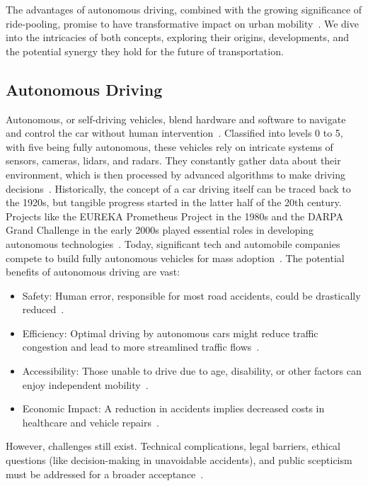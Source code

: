  The advantages of autonomous driving, combined with the growing significance of ride-pooling, promise to have transformative impact on urban mobility~\cite{Stamadianos.2023}. We dive into the intricacies of both concepts, exploring their origins, developments, and the potential synergy they hold for the future of transportation.

\subsection{Autonomous Driving}
Autonomous, or self-driving vehicles, blend hardware and software to navigate and control the car without human intervention~\cite{Stamadianos.2023}. Classified into levels 0 to 5, with five being fully autonomous, these vehicles rely on intricate systems of sensors, cameras, lidars, and radars. They constantly gather data about their environment, which is then processed by advanced algorithms to make driving decisions~\cite{Hacohen.2022}.
Historically, the concept of a car driving itself can be traced back to the 1920s, but tangible progress started in the latter half of the 20th century. Projects like the EUREKA Prometheus Project in the 1980s and the DARPA Grand Challenge in the early 2000s played essential roles in developing autonomous technologies~\cite{Hacohen.2022}. Today, significant tech and automobile companies compete to build fully autonomous vehicles for mass adoption~\cite{Stamadianos.2023}.
The potential benefits of autonomous driving are vast:
\begin{itemize}
    \item Safety: Human error, responsible for most road accidents, could be drastically reduced~\cite{Hacohen.2022}.
    \item Efficiency: Optimal driving by autonomous cars might reduce traffic congestion and lead to more streamlined traffic flows~\cite{Stamadianos.2023}.
    \item Accessibility: Those unable to drive due to age, disability, or other factors can enjoy independent mobility~\cite{Hacohen.2022}.
    \item Economic Impact: A reduction in accidents implies decreased costs in healthcare and vehicle repairs~\cite{Stamadianos.2023}.
\end{itemize}

However, challenges still exist. Technical complications, legal barriers, ethical questions (like decision-making in unavoidable accidents), and public scepticism must be addressed for a broader acceptance~\cite{Hacohen.2022}.

